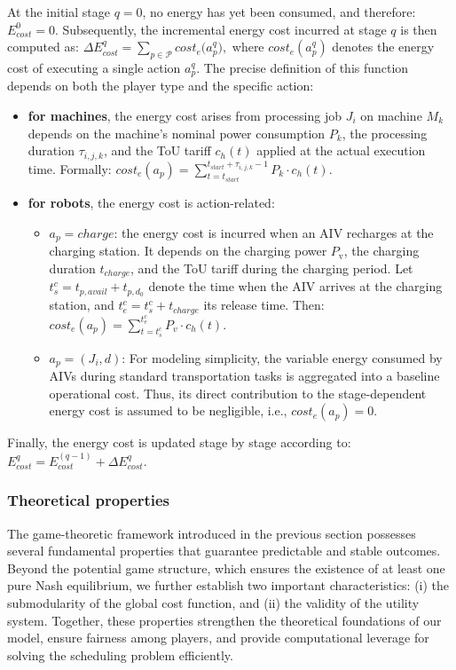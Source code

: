 \documentclass[preprint, 3p, review, 12pt]{elsarticle}
\begin{document}
At the initial stage $q=0$, no energy has yet been consumed, and therefore: $E_{cost}^{0} = 0$. Subsequently, the incremental energy cost incurred at stage $q$ is then computed as:  $\Delta E_{cost}^{q} = \displaystyle \sum_{p \in \mathcal{P}} cost_e\big(a_p^{q}\big),$
where $cost_e(a_p^{q})$ denotes the energy cost of executing a single action $a_p^{q}$. The precise definition of this function depends on both the player type and the specific action:  
\begin{itemize}
    \item \textbf{for machines}, the energy cost arises from processing job $J_i$ on machine $M_k$ depends on the machine’s nominal power consumption $P_k$, the processing duration $\tau_{i,j,k}$, and the ToU tariff $c_h(t)$ applied at the actual execution time. Formally:  $cost_e(a_p) = \displaystyle \sum_{t = t_{start}}^{t_{start} + \tau_{i,j,k} - 1} P_k \cdot c_h(t).$
    \item \textbf{for robots}, the energy cost is action-related:
    \begin{itemize}
        \item $a_p = charge$: the energy cost is incurred when an AIV recharges at the charging station. It depends on the charging power $P_{\text{v}}$, the charging duration $t_{charge}$, and the ToU tariff during the charging period. Let $t_s^c = t_{p, avail} + t_{p,d_0}$ denote the time when the AIV arrives at the charging station, and $t_e^c = t_s^c + t_{charge}$ its release time. Then:  $cost_e(a_p) = \displaystyle \sum_{t = t_s^c}^{t_e^c} P_v \cdot c_h(t).$
        \item $a_p = (J_i, d)$: For modeling simplicity, the variable energy consumed by AIVs during standard transportation tasks is aggregated into a baseline operational cost. Thus, its direct contribution to the stage-dependent energy cost is assumed to be negligible, i.e., $cost_e(a_p) = 0$. 
    \end{itemize}
\end{itemize}
Finally, the energy cost is updated stage by stage according to:  $E_{cost}^{q} = E_{cost}^{(q-1)} + \Delta E_{cost}^{q}$.

\subsubsection{Theoretical properties}
The game-theoretic framework introduced in the previous section possesses several fundamental properties that guarantee predictable and stable outcomes. Beyond the potential game structure, which ensures the existence of at least one pure Nash equilibrium, we further establish two important characteristics: (i) the submodularity of the global cost function, and (ii) the validity of the utility system. Together, these properties strengthen the theoretical foundations of our model, ensure fairness among players, and provide computational leverage for solving the scheduling problem efficiently.
\end{document}
